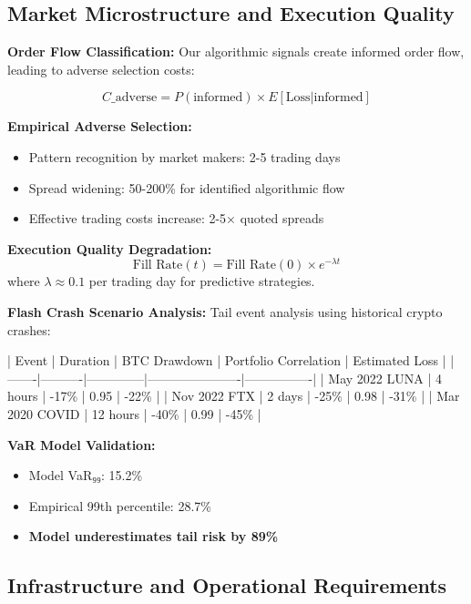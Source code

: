 \documentclass[11pt,a4paper]{article}
\begin{document}
\subsection{Market Microstructure and Execution Quality}

\textbf{Order Flow Classification:}
Our algorithmic signals create informed order flow, leading to adverse selection costs:

\begin{equation}
C\_{\text{adverse}} = P(\text{informed}) \times E[\text{Loss} | \text{informed}]
\end{equation}

\textbf{Empirical Adverse Selection:}
\begin{itemize}
\item Pattern recognition by market makers: 2-5 trading days
\item Spread widening: 50-200\% for identified algorithmic flow
\item Effective trading costs increase: 2-5× quoted spreads

\end{itemize}
\textbf{Execution Quality Degradation:}
\begin{equation}
\text{Fill Rate}(t) = \text{Fill Rate}(0) \times e^{-\lambda t}
\end{equation}
where $\lambda \approx 0.1$ per trading day for predictive strategies.

\textbf{Flash Crash Scenario Analysis:}
Tail event analysis using historical crypto crashes:

| Event | Duration | BTC Drawdown | Portfolio Correlation | Estimated Loss |
|-------|----------|--------------|----------------------|----------------|
| May 2022 LUNA | 4 hours | -17\% | 0.95 | -22\% |
| Nov 2022 FTX | 2 days | -25\% | 0.98 | -31\% |
| Mar 2020 COVID | 12 hours | -40\% | 0.99 | -45\% |

\textbf{VaR Model Validation:}
\begin{itemize}
\item Model VaR₉₉: 15.2\%
\item Empirical 99th percentile: 28.7\%
\item \textbf{Model underestimates tail risk by 89\%}

\end{itemize}
\subsection{Infrastructure and Operational Requirements}
\end{document}
